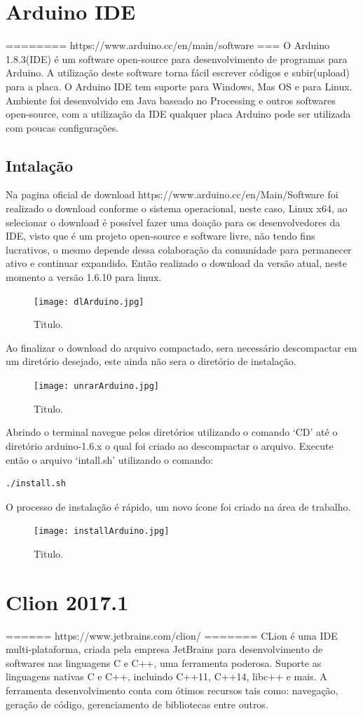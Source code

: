 \documentclass[a4paper,12pt,portuguese]{ufms-cpcx}
\begin{document}
\section{Arduino IDE}\label{arduinoide}
======== https://www.arduino.cc/en/main/software ===
O Arduino 1.8.3(IDE) é um software open-source para desenvolvimento de programas para Arduino. A utilização deste software torna fácil escrever códigos e subir(upload) para a placa. O Arduino IDE tem suporte para Windows, Mas OS e para Linux. Ambiente foi desenvolvido em Java baseado no Processing e outros softwares open-source, com a utilização da IDE qualquer placa Arduino pode ser utilizada com poucas configurações.

\subsection{Intalação}
Na pagina oficial de download https://www.arduino.cc/en/Main/Software foi realizado o download conforme o sistema operacional, neste caso, Linux x64, ao selecionar o download é possível fazer uma doação para os desenvolvedores da IDE, visto que é um projeto open-source e software livre, não tendo fins lucrativos, o mesmo depende dessa colaboração da comunidade para permanecer ativo e continuar expandido. Então realizado o download da versão atual, neste momento a versão 1.6.10 para linux.

\begin{figure}[H]	
	\centering
	\texttt{[image: dlArduino.jpg]}
	\caption{Titulo.}
\end{figure}
Ao finalizar o download do arquivo compactado, sera necessário descompactar em um diretório desejado, este ainda não sera o diretório de instalação. 
\begin{figure}[H]	
	\centering
	\texttt{[image: unrarArduino.jpg]}
	\caption{Titulo.}
\end{figure}
Abrindo o terminal navegue pelos diretórios utilizando o comando ‘CD’ até o diretório arduino-1.6.x o qual foi criado ao descompactar o arquivo. Execute então o arquivo ‘intall.sh’ utilizando o comando: 
\begin{lstlisting}
./install.sh
\end{lstlisting}
O processo de instalação é rápido, um novo ícone foi criado na área de trabalho.
\begin{figure}[H]	
	\centering
	\texttt{[image: installArduino.jpg]}
	\caption{Titulo.}
\end{figure}

\section{Clion 2017.1}
====== https://www.jetbrains.com/clion/ =======
CLion é uma IDE multi-plataforma, criada pela empresa JetBrains para desenvolvimento de softwares nas linguagens C e C++, uma ferramenta poderosa. Suporte as linguagens nativas C e C++, incluindo C++11, C++14, libc++ e mais. A ferramenta desenvolvimento conta com ótimos recursos tais como: navegação, geração de código, gerenciamento de bibliotecas entre outros.
\end{document}
